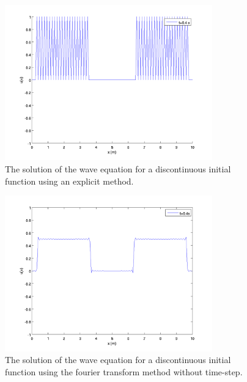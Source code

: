 \begin{figure}[htbp]
	\centering
	\includegraphics[width=0.8\textwidth]{img/discontExplicit}
	\caption{The solution of the wave equation for a discontinuous initial function using an explicit method.}
	\label{fig:discontExplicit}
\end{figure}

\begin{figure}[htbp]
	\centering
	\includegraphics[width=0.8\textwidth]{img/discontFFTimmediate}
	\caption{The solution of the wave equation for a discontinuous initial function using the fourier transform method without time-step.}
	\label{fig:discontFFTimmediate}
\end{figure}


